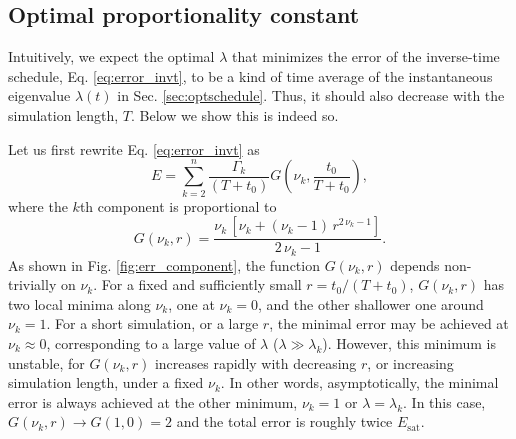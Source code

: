 \documentclass[reprint, floatfix]{revtex4-1}
\newcommand{\Err}{E}
\begin{document}
%






\subsection{\label{sec:optlambda}
Optimal proportionality constant
}




Intuitively,
we expect the optimal $\lambda$
that minimizes the error of the inverse-time schedule,
Eq. \eqref{eq:error_invt},
to be a kind of time average of
the instantaneous eigenvalue $\lambda(t)$
in Sec. \ref{sec:optschedule}.
%
Thus, it should also decrease with
the simulation length, $T$.
%
Below we show this is indeed so.

Let us first rewrite Eq. \eqref{eq:error_invt} as
%
$$
\Err
=
\sum_{ k = 2 }^n
  \frac{ \Gamma_k  }
       { (T + t_0) }
  G\left( \nu_k, \frac{ t_0 } { T + t_0} \right),
$$
%
where the $k$th component is proportional to
%
$$
G\left( \nu_k, r \right)
=
\frac { \nu_k
        \,
        \left[
          \nu_k
          +
          (\nu_k - 1) \,
          r^{2 \, \nu_k - 1}
        \right]
      }
      { 2 \, \nu_k - 1 }
.
$$
%
As shown in Fig. \ref{fig:err_component},
the function $G(\nu_k, r)$ depends non-trivially on $\nu_k$.
%
For a fixed and sufficiently small $r = t_0 / (T + t_0)$,
$G(\nu_k, r)$ has two local minima along $\nu_k$,
one at $\nu_k = 0$,
and the other shallower one around $\nu_k = 1$.
%
For a short simulation, or a large $r$,
the minimal error may be achieved at $\nu_k \approx 0$,
corresponding to a large value of $\lambda$
($\lambda \gg \lambda_k$).
%
However, this minimum is unstable,
for $G(\nu_k, r)$ increases rapidly
with decreasing $r$, or increasing simulation length,
under a fixed $\nu_k$.
%
In other words,
asymptotically, the minimal error
is always achieved at the other minimum,
$\nu_k = 1$ or $\lambda = \lambda_k$.
%
In this case,
$G(\nu_k, r) \to G(1, 0) = 2$
and the total error is roughly twice $E_\mathrm{sat}$.
\end{document}
